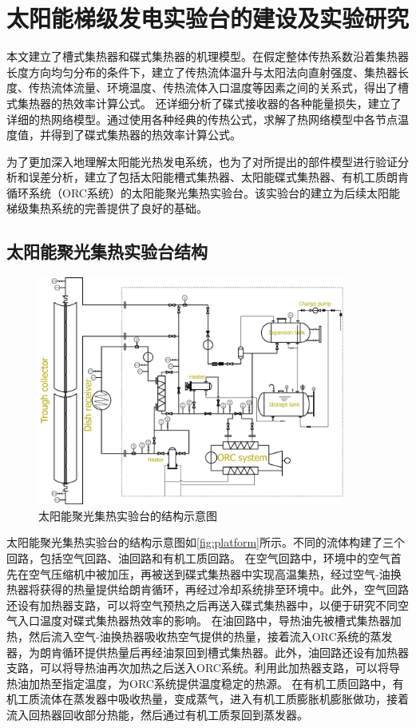 \chapter{太阳能梯级发电实验台的建设及实验研究}

本文建立了槽式集热器和碟式集热器的机理模型。在假定整体传热系数沿着集热器长度方向均匀分布的条件下，建立了传热流体温升与太阳法向直射强度、集热器长度、传热流体流量、环境温度、传热流体入口温度等因素之间的关系式，得出了槽式集热器的热效率计算公式。
还详细分析了碟式接收器的各种能量损失，建立了详细的热网络模型。通过使用各种经典的传热公式，求解了热网络模型中各节点温度值，并得到了碟式集热器的热效率计算公式。

为了更加深入地理解太阳能光热发电系统，也为了对所提出的部件模型进行验证分析和误差分析，建立了包括太阳能槽式集热器、太阳能碟式集热器、有机工质朗肯循环系统（ORC系统）的太阳能聚光集热实验台。该实验台的建立为后续太阳能梯级集热系统的完善提供了良好的基础。

\section{太阳能聚光集热实验台结构}

\begin{figure}[!ht]
\centering
\includegraphics[width=0.9\textwidth]{fig/platform.jpg}
\caption{太阳能聚光集热实验台的结构示意图}\label{fig:platform}
\end{figure}
太阳能聚光集热实验台的结构示意图如\autoref{fig:platform}所示。不同的流体构建了三个回路，包括空气回路、油回路和有机工质回路。
在空气回路中，环境中的空气首先在空气压缩机中被加压，再被送到碟式集热器中实现高温集热，经过空气-油换热器将获得的热量提供给朗肯循环，再经过冷却系统排至环境中。此外，空气回路还设有加热器支路，可以将空气预热之后再送入碟式集热器中，以便于研究不同空气入口温度对碟式集热器热效率的影响。
在油回路中，导热油先被槽式集热器加热，然后流入空气-油换热器吸收热空气提供的热量，接着流入ORC系统的蒸发器，为朗肯循环提供热量后再经油泵回到槽式集热器。此外，油回路还设有加热器支路，可以将导热油再次加热之后送入ORC系统。利用此加热器支路，可以将导热油加热至指定温度，为ORC系统提供温度稳定的热源。
在有机工质回路中，有机工质流体在蒸发器中吸收热量，变成蒸气，进入有机工质膨胀机膨胀做功，接着流入回热器回收部分热能，然后通过有机工质泵回到蒸发器。


